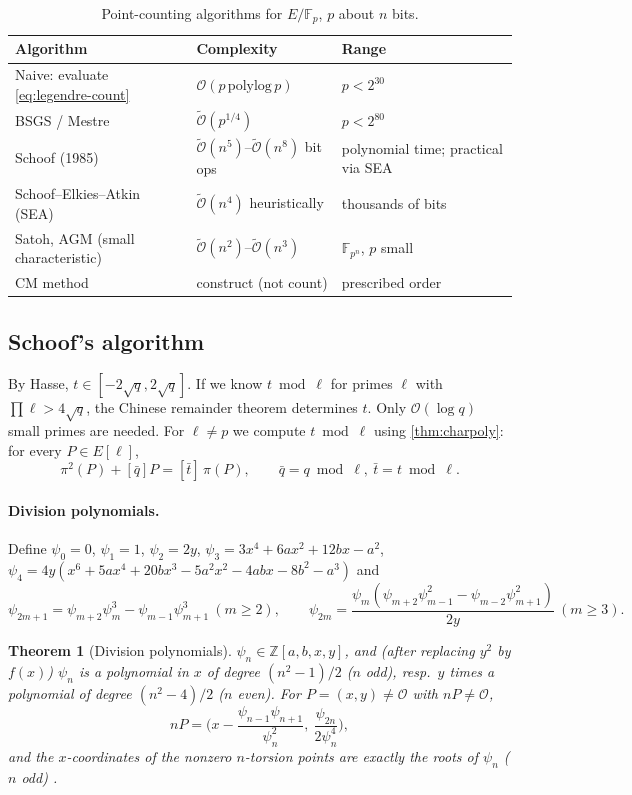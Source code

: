 \documentclass[11pt,a4paper,oneside]{book}
\theoremstyle{plain}
\newtheorem{theorem}{Theorem}[chapter]
\theoremstyle{definition}
\theoremstyle{remark}
\newcommand{\Z}{\mathbb{Z}}
\newcommand{\F}{\mathbb{F}}
\newcommand{\Fp}{\mathbb{F}_p}
\newcommand{\Oinf}{\mathcal{O}}
\newcommand{\bigO}{\mathcal{O}}
\newcommand{\softO}{\widetilde{\mathcal{O}}}
\begin{document}
\begin{table}[ht]
\centering\small
\caption{Point-counting algorithms for $E/\Fp$, $p$ about $n$ bits.}
\begin{tabular}{@{}lll@{}}
\toprule
Algorithm & Complexity & Range\\
\midrule
Naive: evaluate \eqref{eq:legendre-count} & $\bigO(p\,\mathrm{polylog}\,p)$ & $p<2^{30}$\\
BSGS / Mestre & $\softO(p^{1/4})$ & $p<2^{80}$\\
Schoof (1985) & $\softO(n^{5})$--$\softO(n^8)$ bit ops & polynomial time; practical via SEA\\
Schoof--Elkies--Atkin (SEA) & $\softO(n^4)$ heuristically & thousands of bits\\
Satoh, AGM (small characteristic) & $\softO(n^{2})$--$\softO(n^3)$ & $\F_{p^n}$, $p$ small\\
CM method & construct (not count) & prescribed order\\
\bottomrule
\end{tabular}
\end{table}

\subsection{Schoof's algorithm}

By Hasse, $t\in[-2\sqrt q,2\sqrt q]$. If we know $t\bmod\ell$ for primes $\ell$ with $\prod\ell>4\sqrt q$, the Chinese remainder theorem determines $t$. Only $\bigO(\log q)$ small primes are needed. For $\ell\ne p$ we compute $t\bmod\ell$ using \cref{thm:charpoly}: for every $P\in E[\ell]$,
\begin{equation}\label{eq:schoof}
\pi^2(P)+[\bar q]P=[\bar t]\,\pi(P),\qquad\bar q=q\bmod\ell,\ \bar t=t\bmod\ell.
\end{equation}

\paragraph{Division polynomials.} Define $\psi_0=0$, $\psi_1=1$, $\psi_2=2y$, $\psi_3=3x^4+6ax^2+12bx-a^2$, $\psi_4=4y(x^6+5ax^4+20bx^3-5a^2x^2-4abx-8b^2-a^3)$ and
\[
\psi_{2m+1}=\psi_{m+2}\psi_m^3-\psi_{m-1}\psi_{m+1}^3\ (m\ge2),\qquad
\psi_{2m}=\frac{\psi_m(\psi_{m+2}\psi_{m-1}^2-\psi_{m-2}\psi_{m+1}^2)}{2y}\ (m\ge3).
\]
\begin{theorem}[Division polynomials]\label{thm:divpoly}
$\psi_n\in\Z[a,b,x,y]$, and (after replacing $y^2$ by $f(x)$) $\psi_n$ is a polynomial in $x$ of degree $(n^2-1)/2$ ($n$ odd), resp.\ $y$ times a polynomial of degree $(n^2-4)/2$ ($n$ even). For $P=(x,y)\ne\Oinf$ with $nP\ne\Oinf$,
\[
nP=\Big(x-\frac{\psi_{n-1}\psi_{n+1}}{\psi_n^2},\ \frac{\psi_{2n}}{2\psi_n^4}\Big),
\]
and the $x$-coordinates of the nonzero $n$-torsion points are exactly the roots of $\psi_n$ ($n$ odd) .
\end{theorem}
\end{document}
